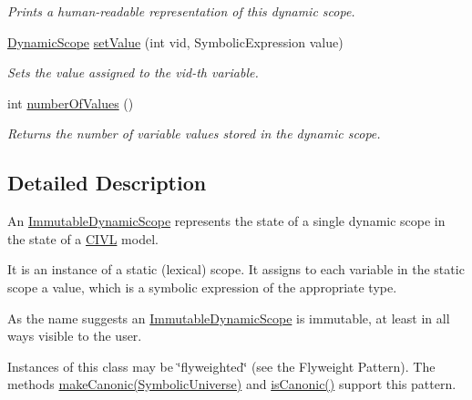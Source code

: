 \begin{DoxyCompactItemize}
\begin{DoxyCompactList}\small\item\em Prints a human-\/readable representation of this dynamic scope. \end{DoxyCompactList}\item 
\hyperlink{interfaceedu_1_1udel_1_1cis_1_1vsl_1_1civl_1_1state_1_1IF_1_1DynamicScope}{Dynamic\+Scope} \hyperlink{classedu_1_1udel_1_1cis_1_1vsl_1_1civl_1_1state_1_1common_1_1immutable_1_1ImmutableDynamicScope_aeb9b251d983423ac1d14ddc908d4e40d}{set\+Value} (int vid, Symbolic\+Expression value)
\begin{DoxyCompactList}\small\item\em Sets the value assigned to the vid-\/th variable. \end{DoxyCompactList}\item 
int \hyperlink{classedu_1_1udel_1_1cis_1_1vsl_1_1civl_1_1state_1_1common_1_1immutable_1_1ImmutableDynamicScope_af45d46cca4afa2dc83596dbf5de7ed02}{number\+Of\+Values} ()
\begin{DoxyCompactList}\small\item\em Returns the number of variable values stored in the dynamic scope. \end{DoxyCompactList}\end{DoxyCompactItemize}


\subsection{Detailed Description}
An \hyperlink{classedu_1_1udel_1_1cis_1_1vsl_1_1civl_1_1state_1_1common_1_1immutable_1_1ImmutableDynamicScope}{Immutable\+Dynamic\+Scope} represents the state of a single dynamic scope in the state of a \hyperlink{classedu_1_1udel_1_1cis_1_1vsl_1_1civl_1_1CIVL}{C\+I\+V\+L} model. 

It is an instance of a static (lexical) scope. It assigns to each variable in the static scope a value, which is a symbolic expression of the appropriate type.

As the name suggests an \hyperlink{classedu_1_1udel_1_1cis_1_1vsl_1_1civl_1_1state_1_1common_1_1immutable_1_1ImmutableDynamicScope}{Immutable\+Dynamic\+Scope} is immutable, at least in all ways visible to the user.

Instances of this class may be \char`\"{}flyweighted\char`\"{} (see the Flyweight Pattern). The methods \hyperlink{}{make\+Canonic(\+Symbolic\+Universe)} and \hyperlink{}{is\+Canonic()} support this pattern.

